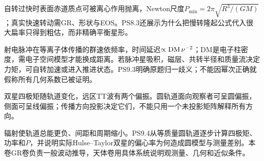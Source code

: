 自转过快时表面赤道质点可被离心作用抛离，Newton尺度$P_{\min}=2\pi\sqrt{R^3/(GM)}$；真实快速转动需GR、形状与EOS。PS8.3还展示为什么把慢转隆起公式代入很大扁率只得到粗估，而非精确平衡星形。

射电脉冲在等离子体传播的群速依频率，时间延迟$\propto{\rm DM}\,\nu^{-2}$；DM是电子柱密度，需电子空间模型才能换成距离。若脉冲星吸积，磁层、共转半径和质量流决定力矩，可自转加速或进入推进状态。PS9.3明确原题归一歧义；不能因幂次正确就假称所有几何系数已被证明。

双星四极矩随轨道变化，远区TT波有两个偏振。圆轨道面向观察者可呈圆偏振，侧面可呈线偏振；传播方向投影决定它们，不能只用一个未投影矩阵解释所有方向。

辐射使轨道总能更负、间距和周期缩小。PS9.4从等质量圆轨道逐步计算四极矩、功率和$\dot P$，并说明实际Hulse--Taylor双星的偏心率为何造成圆模型与测量差别。本卷GR卷负责一般波动推导，天体卷用具体系统说明观测量、几何和近似条件。
